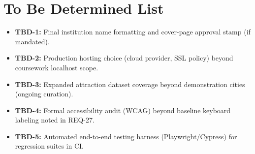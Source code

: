 \documentclass[12pt,oneside,openany]{report}
\begin{document}
\chapter{To Be Determined List}
\begin{itemize}[nosep]
\item \textbf{TBD-1:} Final institution name formatting and cover-page approval stamp (if mandated).
\item \textbf{TBD-2:} Production hosting choice (cloud provider, SSL policy) beyond coursework localhost scope.
\item \textbf{TBD-3:} Expanded attraction dataset coverage beyond demonstration cities (ongoing curation).
\item \textbf{TBD-4:} Formal accessibility audit (WCAG) beyond baseline keyboard labeling noted in REQ-27.
\item \textbf{TBD-5:} Automated end-to-end testing harness (Playwright/Cypress) for regression suites in CI.
\end{itemize}
\end{document}
